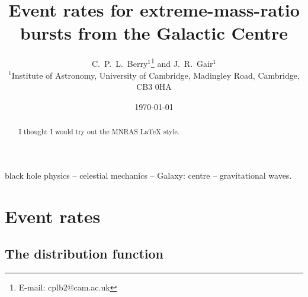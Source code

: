\documentclass[useAMS,usedcolumn,usegraphicx,usenatbib]{mn2e}
\title[Event rates for EMRBs from the GC]{Event rates for extreme-mass-ratio bursts from the Galactic Centre}
\author[C.\ P.\ L.\ Berry and J.\ R.\ Gair]{C.\ P.\ L.\ Berry$^{1}$\thanks{E-mail:
cplb2@cam.ac.uk}  and J.\ R.\ Gair$^{1}$\\
$^{1}$Institute of Astronomy, University of Cambridge, Madingley Road, Cambridge, CB3 0HA}
\begin{document}
\date{\today}

\pagerange{\pageref{firstpage}--\pageref{lastpage}} 

\maketitle

\label{firstpage}

\begin{abstract}
I thought I would try out the MNRAS \LaTeX{} style.
\end{abstract}

\begin{keywords}
black hole physics -- celestial mechanics -- Galaxy: centre -- gravitational waves.
\end{keywords}

\section{Event rates}

\subsection{The distribution function}
\end{document}
